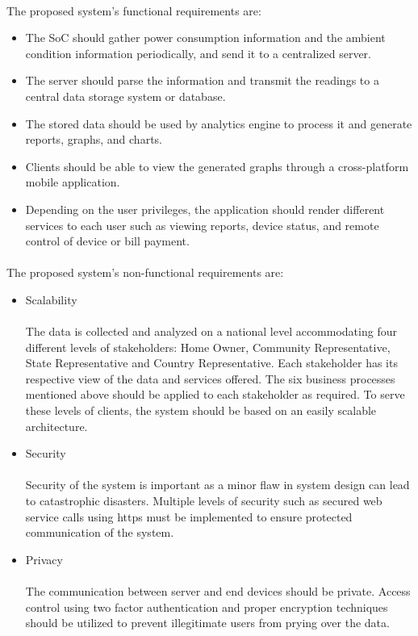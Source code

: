 \documentclass[a4paper,12pt,oneside]{article}
\begin{document}
\paragraph{}
The proposed system’s functional requirements are:
\begin{itemize}
    \item The SoC should gather power consumption information
    and the ambient condition information periodically, and
    send it to a centralized server.
    \item The server should parse the information and transmit
    the readings to a central data storage system or
    database.
    \item The stored data should be used by analytics engine to
    process it and generate reports, graphs, and charts.
    \item Clients should be able to view the generated graphs
    through a cross-platform mobile application.
    \item Depending on the user privileges, the application
    should render different services to each user such as
    viewing reports, device status, and remote control of
    device or bill payment.
\end{itemize}
\newpage
\paragraph{}
The proposed system’s non-functional requirements are:
\begin{itemize}
    \item Scalability
    \paragraph{}The data is collected and analyzed on a national level
    accommodating four different levels of stakeholders: Home
    Owner, Community Representative, State Representative
    and Country Representative. Each stakeholder has
    its respective view of the data and services offered. The
    six business processes mentioned above should be applied
    to each stakeholder as required. To serve these levels of
    clients, the system should be based on an easily scalable
    architecture.
    \item Security
    \paragraph{}Security of the system is important as a minor flaw in
    system design can lead to catastrophic disasters. Multiple
    levels of security such as secured web service calls using https
    must be implemented to ensure protected communication of
    the system.
    \item Privacy
    \paragraph{}
    The communication between server and end devices should
    be private. Access control using two factor authentication and
    proper encryption techniques should be utilized to prevent
    illegitimate users from prying over the data.
    
\end{itemize}
\end{document}
